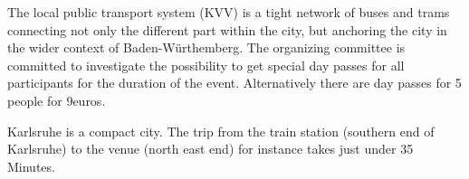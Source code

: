 The local public transport system (KVV) is a tight network of buses and trams connecting not only the different part within the city, but anchoring the city in the wider context of Baden-Würthemberg. The organizing committee is committed to investigate the possibility to get special day passes for all participants for the duration of the event. Alternatively there are day passes for 5 people for 9euros.

Karlsruhe is a compact city. The trip from the train station (southern end of Karlsruhe) to the venue (north east end) for instance takes just under 35 Minutes.
